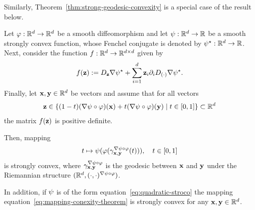 \noindent Similarly, Theorem~\ref{thm:strong-geodesic-convexity} is a special case of the result below.
\begin{theorem}
    Let $\varphi:\mathbb{R}^d \to \mathbb{R}^d$ be a smooth diffeomorphism and let $\psi: \mathbb{R}^d \to \mathbb{R}$ be a smooth strongly convex function, whose Fenchel conjugate is denoted by $\psi^\star: \mathbb{R}^d\to\mathbb{R}$. Next, consider the function $f:\mathbb{R}^d \to \mathbb{R}^{d \times d}$ given by 
    \begin{equation}
        f(\mathbf{z}) := D_{\mathbf{z}} \nabla \psi^\star  + \sum_{i=1}^d \mathbf{z}_i \partial_i D_{(\cdot)} \nabla \psi^\star.
    \end{equation}
    Finally, let $\mathbf{x}, \mathbf{y} \in \mathbb{R}^d$ be vectors and assume that for all vectors 
    $$
    \mathbf{z}\in \{(1 - t)(\nabla \psi \circ \varphi)(\mathbf{x}) + t (\nabla \psi \circ \varphi)(\mathbf{y}) \mid t \in [0,1]\} \subset \mathbb{R}^d
    $$
    the matrix $f(\mathbf{z})$ is positive definite.
    
    Then, mapping 
    \begin{equation}
        t \mapsto \psi(\varphi(\gamma^{\nabla \psi \circ \varphi}_{\mathbf{x}, \mathbf{y}}(t))), \quad t \in [0,1]
        \label{eq:mapping-conexity-theorem}
    \end{equation}
    is strongly convex, where $\gamma^{\nabla \psi \circ \varphi}_{\mathbf{x}, \mathbf{y}}$ is the geodesic between $\mathbf{x}$ and $\mathbf{y}$ under the Riemannian structure $(\mathbb{R}^d, (\cdot,\cdot)^{\nabla \psi \circ \varphi})$. 
    
    In addition, if $\psi$ is of the form equation~\eqref{eq:quadratic-stroco} the mapping equation~\eqref{eq:mapping-conexity-theorem} is strongly convex for any $\mathbf{x}, \mathbf{y} \in \mathbb{R}^d$.
\end{theorem}

